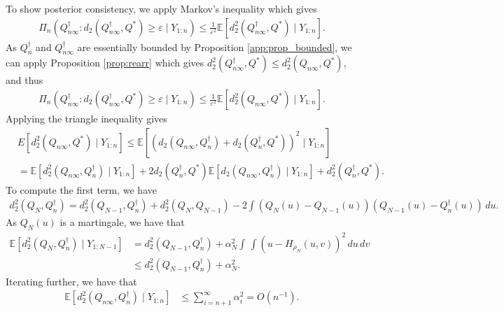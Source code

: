 \documentclass[11pt,a4paper]{article}
\newcommand{\E}{\mathbb{E}}
\begin{document}
\begin{appendices}
To show posterior consistency, we apply Markov's inequality which gives
 \begin{align*}
        \Pi_n\left(Q^{\dagger}_{n\infty}: d_2\left(Q^{\dagger}_{n\infty},Q^*\right) \geq \varepsilon \mid Y_{1:n}\right) \leq \frac{1}{\varepsilon^2 }\E\left[d^2_2\left(Q^{\dagger}_{n\infty},Q^*\right)\mid Y_{1:n}\right].\end{align*}
As $Q_{n}^{\dagger}$ and $Q_{n\infty}^{\dagger}$ are essentially bounded by {Proposition \ref{app:prop_bounded}}, 
we can apply {Proposition \ref{prop:rearr}} which gives $d^2_2(Q^{\dagger}_{n\infty},Q^*)\leq d^2_2\left(Q_{n\infty},Q^*\right)$, and thus
 \begin{align*}
        \Pi_n\left(Q^{\dagger}_{n\infty}: d_2\left(Q^{\dagger}_{n\infty},Q^*\right) \geq \varepsilon \mid Y_{1:n}\right) \leq \frac{1}{\varepsilon^2 }\E\left[d^2_2\left(Q_{n\infty},Q^*\right)\mid Y_{1:n}\right].\end{align*}
 Applying the triangle inequality gives
\begin{align*}
&E\left[d^2_2\left(Q_{n\infty}, Q^*\right)\mid Y_{1:n}\right] \leq \E\left[\left(d_2\left(Q_{n\infty}, Q_n^{\dagger}\right) + d_2\left(Q_n^{\dagger}, Q^*\right)\right)^2\mid Y_{1:n}\right] \\
  &=\E\left[ d^2_2\left(Q_{n\infty}, Q_n^{\dagger}\right)\mid Y_{1:n}\right] +2d_2\left(Q_n^{\dagger}, Q^*\right)\E\left[ d_2\left(Q_{n\infty}, Q_n^{\dagger}\right)\mid Y_{1:n}\right] + d^2_2\left(Q_n^{\dagger}, Q^*\right). 
\end{align*}
To compute the first term, we have
\begin{align*}
    d^2_2\left(Q_N,Q_n^{\dagger}\right) = d^2_2(Q_{N-1},Q_n^{\dagger}) + d^2_2\left(Q_N,Q_{N-1}\right) - 2 \int \left(Q_N(u)-Q_{N-1}(u)\right)\left(Q_{N-1}(u)-Q_n^{\dagger}(u)\right) \, du.
\end{align*}
As $Q_N(u)$ is a martingale, we have that
\begin{align*}
  \E\left[d^2_2\left(Q_N,Q_n^{\dagger}\right) \mid Y_{1:N-1} \right]&= d^2_2(Q_{N-1},Q_n^{\dagger}) + \alpha_{N}^2 \int \, \int \left(u - H_{\rho_N}(u,v)\right)^2 \, du \, dv\\
   &\leq  d^2_2(Q_{N-1},Q_n^{\dagger}) + \alpha_{N}^2.
\end{align*}
Iterating further, we have that
\begin{align*}
  \E\left[d^2_2\left(Q_{n\infty},Q_n^{\dagger}\right) \mid Y_{1:n} \right]&\leq \sum_{i = n+1}^\infty \alpha_i^2 = O(n^{-1}).
\end{align*}

\end{appendices}
\end{document}
